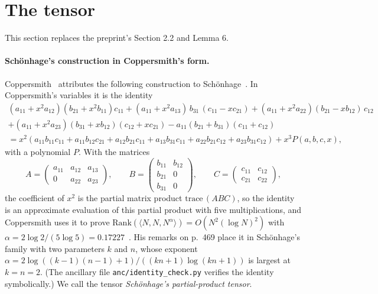 \documentclass[11pt]{article}
\theoremstyle{definition}
\theoremstyle{remark}
\begin{document}
\section{The tensor}\label{m:sec:tensor}

This section replaces the preprint's Section 2.2 and Lemma 6.

\paragraph{Schönhage's construction in Coppersmith's form.} Coppersmith~\cite[p.~467]{Cop82} attributes the following construction to Schönhage~\cite{Sch81}. In Coppersmith's variables it is the identity
\begin{multline*}
(a_{11}+x^2a_{12})(b_{21}+x^2b_{11})c_{11}+(a_{11}+x^2a_{13})\,b_{31}\,(c_{11}-xc_{21})+(a_{11}+x^2a_{22})(b_{21}-xb_{12})\,c_{12}\\
+(a_{11}+x^2a_{23})(b_{31}+xb_{12})(c_{12}+xc_{21})-a_{11}(b_{21}+b_{31})(c_{11}+c_{12})\\
=x^2(a_{11}b_{11}c_{11}+a_{11}b_{12}c_{21}+a_{12}b_{21}c_{11}+a_{13}b_{31}c_{11}+a_{22}b_{21}c_{12}+a_{23}b_{31}c_{12})+x^3P(a,b,c,x),
\end{multline*}
with a polynomial $P$. With the matrices
\[
A=\begin{pmatrix}a_{11}&a_{12}&a_{13}\\0&a_{22}&a_{23}\end{pmatrix},\qquad B=\begin{pmatrix}b_{11}&b_{12}\\b_{21}&0\\b_{31}&0\end{pmatrix},\qquad C=\begin{pmatrix}c_{11}&c_{12}\\c_{21}&c_{22}\end{pmatrix},
\]
the coefficient of $x^2$ is the partial matrix product $\mathrm{trace}\,(ABC)$, so the identity is an approximate evaluation of this partial product with five multiplications, and Coppersmith uses it to prove $\mathrm{Rank}(\langle N,N,N^\alpha\rangle)=O(N^2(\log N)^2)$ with $\alpha=2\log2/(5\log5)=0.17227$~\cite[p.~467]{Cop82}. His remarks on p.~469 place it in Schönhage's family with two parameters $k$ and $n$, whose exponent $\alpha=2\log((k-1)(n-1)+1)/((kn+1)\log(kn+1))$ is largest at $k=n=2$. (The ancillary file \texttt{anc/identity\_check.py} verifies the identity symbolically.) We call the tensor \emph{Schönhage's partial-product tensor}.
\end{document}
